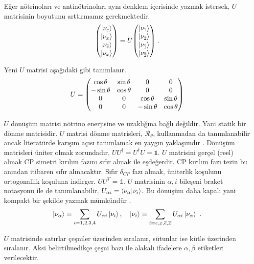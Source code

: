 Eğer nötrinoları ve antinötrinoları aynı denklem içerisinde yazmak istersek, $ U $ matrisinin boyutunu arttırmamız gerekmektedir.
\begin{equation}
	\mqty(\ket{\nu_{e}} \\ \ket{\nu_{x}} \\ \ket{\nu_{\bar{e}}} \\ \ket{\nu_{\bar{x}}} ) = U \mqty(\ket{\nu_{1}} \\ \ket{\nu_{2}} \\\ket{\nu_{\bar{1}}} \\ \ket{\nu_{\bar{2}}}) \text{ .}
\end{equation}

Yeni $ U $ matrisi aşağıdaki gibi tanımlanır.
\begin{equation}\label{eqn:BoslukSal_DonusumMat}
	U= \mqty( \cos \theta & \sin \theta & 0 & 0 \\ -\sin \theta & \cos \theta & 0 & 0 \\ 0 & 0 & \cos \theta & \sin \theta\\ 0 & 0 & - \sin \theta & \cos \theta)
\end{equation}

$ U $ dönüşüm matrisi nötrino enerjisine ve uzaklığına bağlı değildir. Yani statik bir dönme matrisidir. $ U $ matrisi dönme matrisleri, $ \mathcal{R}_{\theta} $, kullanmadan da tanımlanabilir ancak literatürde karışım açısı tanımlamak en yaygın yaklaşımdır \cite{ParticleDataGroup:2018ovx}. Dönüşüm matrisleri üniter olmak zorundadır, $ U U^{\dagger} = U^{\dagger} U = \mathbb{1}$. $ U $ matrisini gerçel (reel) almak CP simetri kırılım fazını sıfır almak ile eşdeğerdir. CP kırılım fazı tezin bu anından itibaren sıfır alınacaktır. Sıfır $ \delta_{CP} $ fazı almak, üniterlik koşulunu ortogonallik koşuluna indirger. $ U U^{T} = \mathbb{1} $. $ U $ matrisinin $ \alpha,i $ bileşeni braket notasyonu ile de tanımlanabilir, $ U_{\alpha i} =\braket{\nu_{\alpha}}{\nu_{i}} $. Bu dönüşüm daha kapalı yani kompakt bir şekilde yazmak mümkündür \cite{ParticleDataGroup:2018ovx}.
\begin{equation} \label{eqn:BoslukSal_GecisBraKet}
	\ket{\nu_{\alpha}} = \sum_{i=1,2,3,4} U_{\alpha i} \ket{\nu_{i}}\text{,} \quad \ket{\nu_{i}} = \sum_{i=e,x,\overline{e},\overline{x}} U_{\alpha i} \ket{\nu_{\alpha}} \text{ .}
\end{equation}

$ U $ matrisinde satırlar çeşniler üzerinden sıralanır, sütunlar ise kütle üzerinden sıralanır. Aksi belirtilmedikçe çeşni bazı ile alakalı ifadelere $ \alpha,\beta $ etiketleri verilecektir.

